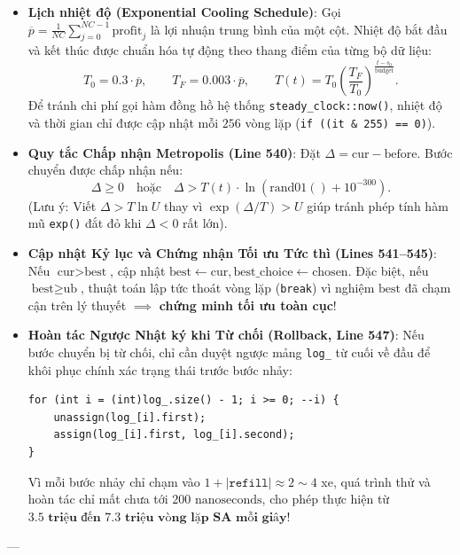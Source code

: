 \documentclass[11pt,a4paper]{article}
\theoremstyle{definition}
\begin{document}
\begin{itemize}[leftmargin=1.5em]
    \item \textbf{Lịch nhiệt độ (Exponential Cooling Schedule)}:
    Gọi $\overline{p} = \frac{1}{NC}\sum_{j=0}^{NC-1} \text{profit}_j$ là lợi nhuận trung bình của một cột. Nhiệt độ bắt đầu và kết thúc được chuẩn hóa tự động theo thang điểm của từng bộ dữ liệu:
    \[
        T_0 = 0.3 \cdot \overline{p}, \qquad T_F = 0.003 \cdot \overline{p}, \qquad T(t) = T_0 \left(\frac{T_F}{T_0}\right)^{\frac{t - s_0}{\text{budget}}}.
    \]
    Để tránh chi phí gọi hàm đồng hồ hệ thống \texttt{steady\_clock::now()}, nhiệt độ và thời gian chỉ được cập nhật mỗi $256$ vòng lặp (\texttt{if ((it \& 255) == 0)}).
    \item \textbf{Quy tắc Chấp nhận Metropolis (Line 540)}:
    Đặt $\Delta = \text{cur} - \text{before}$. Bước chuyển được chấp nhận nếu:
    \begin{equation}
        \Delta \ge 0 \quad \text{hoặc} \quad \Delta > T(t) \cdot \ln(\text{rand01}() + 10^{-300}).
    \end{equation}
    (Lưu ý: Viết $\Delta > T \ln U$ thay vì $\exp(\Delta / T) > U$ giúp tránh phép tính hàm mũ \texttt{exp()} đắt đỏ khi $\Delta < 0$ rất lớn).
    \item \textbf{Cập nhật Kỷ lục và Chứng nhận Tối ưu Tức thì (Lines 541--545)}:
    Nếu $\text{cur} > \text{best}$, cập nhật $\text{best} \leftarrow \text{cur}, \text{best\_choice} \leftarrow \text{chosen}$. Đặc biệt, nếu $\text{best} \ge \text{ub}$, thuật toán lập tức thoát vòng lặp (\texttt{break}) vì nghiệm $\text{best}$ đã chạm cận trên lý thuyết $\implies$ \textbf{chứng minh tối ưu toàn cục}!
    \item \textbf{Hoàn tác Ngược Nhật ký khi Từ chối (Rollback, Line 547)}:
    Nếu bước chuyển bị từ chối, chỉ cần duyệt ngược mảng \texttt{log\_} từ cuối về đầu để khôi phục chính xác trạng thái trước bước nhảy:
    \begin{lstlisting}
for (int i = (int)log_.size() - 1; i >= 0; --i) {
    unassign(log_[i].first);
    assign(log_[i].first, log_[i].second);
}
    \end{lstlisting}
    Vì mỗi bước nhảy chỉ chạm vào $1 + |\texttt{refill}| \approx 2\sim 4$ xe, quá trình thử và hoàn tác chỉ mất chưa tới $200\text{ nanoseconds}$, cho phép thực hiện từ $\mathbf{3.5\text{ triệu đến } 7.3\text{ triệu vòng lặp SA mỗi giây}}$!
\end{itemize}

---

\end{document}
